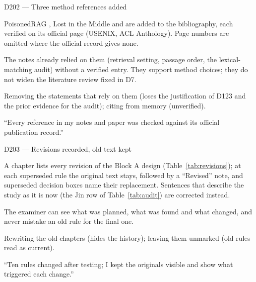 \documentclass[11pt,a4paper]{report}
\begin{document}
\begin{decisionbox}{D202 --- Three method references added}
\begin{description}[nosep, leftmargin=0pt]
  \item[Decision.] PoisonedRAG \citep{zou2024poisonedrag}, Lost in the Middle
    \citep{liu2024lost} and \citet{kamalloo2023evaluating} are added to the
    bibliography, each verified on its official page (USENIX, ACL
    Anthology). Page numbers are omitted where the official record gives
    none.
  \item[Why.] The notes already relied on them (retrieval setting, passage
    order, the lexical-matching audit) without a verified entry. They support
    method choices; they do not widen the literature review fixed in D7.
  \item[Alternatives.] Removing the statements that rely on them (loses the
    justification of D123 and the prior evidence for the audit); citing from
    memory (unverified).
  \item[Interview line.] ``Every reference in my notes and paper was checked
    against its official publication record.''
\end{description}
\end{decisionbox}

\begin{decisionbox}{D203 --- Revisions recorded, old text kept}
\begin{description}[nosep, leftmargin=0pt]
  \item[Decision.] A chapter lists every revision of the Block A design
    (Table~\ref{tab:revisions}); at each superseded rule the original text
    stays, followed by a ``Revised'' note, and superseded decision boxes name
    their replacement. Sentences that describe the study as it is now (the
    Jin row of Table~\ref{tab:audit}) are corrected instead.
  \item[Why.] The examiner can see what was planned, what was found and what
    changed, and never mistake an old rule for the final one.
  \item[Alternatives.] Rewriting the old chapters (hides the history);
    leaving them unmarked (old rules read as current).
  \item[Interview line.] ``Ten rules changed after testing; I kept the
    originals visible and show what triggered each change.''
\end{description}
\end{decisionbox}
\end{document}
